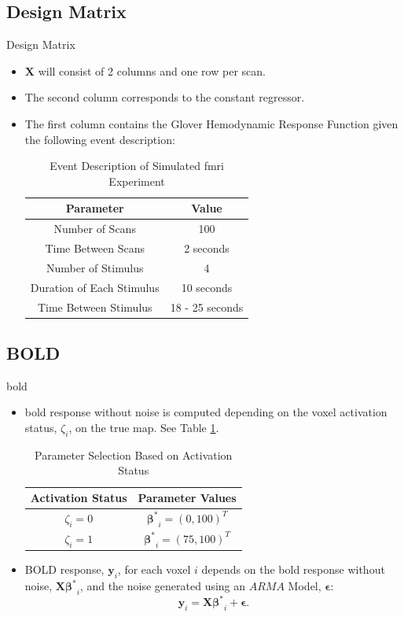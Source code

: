 \documentclass{beamer}
\begin{document}
\subsection{Design Matrix}

\begin{frame}{Design Matrix}
\begin{itemize}
\item $\bm{X}$ will consist of 2 columns and one row per scan.
\item The second column corresponds to the constant regressor.
\item The first column contains the Glover Hemodynamic Response Function
 given the following event description:

\begin{table}
\centering
\caption{Event Description of Simulated \gls{fmri} Experiment}
\begin{tabular}{cc}
\hline
\textbf{Parameter} & \textbf{Value} \\ \hline
Number of Scans & 100 \\
Time Between Scans & 2 seconds \\
Number of Stimulus & 4 \\
Duration of Each Stimulus & 10 seconds \\
Time Between Stimulus & 18 - 25 seconds \\ \hline
\end{tabular}
\end{table}
\end{itemize}
\end{frame}

\subsection{BOLD}

\begin{frame}{\acrshort{bold}}
\begin{itemize}
\item \gls{bold} response without noise is computed depending on the voxel 
activation status, $\zeta_i$, on the true map. See Table \ref{tab:parSelA}.

\begin{table}
\centering
\caption{Parameter Selection Based on Activation Status}
\begin{tabular}{cc}
\hline
\textbf{Activation Status} & \textbf{Parameter Values} \\ \hline
$\zeta_i=0$ & $\bm{\beta^*}_i = (0,100)^T$ \\
$\zeta_i=1$ & $\bm{\beta^*}_i = (75,100)^T$ \\ \hline
\end{tabular}
\label{tab:parSelA}
\end{table}

\item BOLD response, $\bm{y}_i$, for each voxel $i$ depends on the \gls{bold} 
response without noise, $\bm{X}\bm{\beta^*}_i$, and the noise generated 
using an $ARMA$ Model, $\bm{\epsilon}$:
$$
\bm{y}_i = \bm{X}\bm{\beta^*}_i + \bm{\epsilon}.
$$
\end{itemize}
\end{frame}
\end{document}
